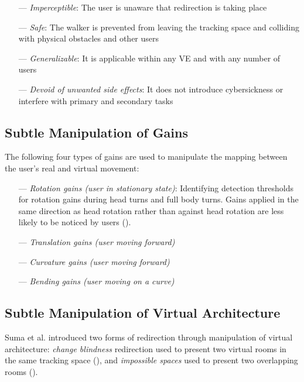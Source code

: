 \documentclass[12pt]{article}
\begin{document}
\begin{itemize}[noitemsep]
    \item[---] \emph{Imperceptible}: The user is unaware that redirection is taking place
    \item[---] \emph{Safe}: The walker is prevented from leaving the tracking space and colliding with physical obstacles and other users
    \item[---] \emph{Generalizable}: It is applicable within any VE and with any number of users
    \item[---] \emph{Devoid of unwanted side effects}: It does not introduce cybersickness or interfere with primary and secondary tasks
\end{itemize}

\subsection{Subtle Manipulation of Gains}

The following four types of gains are used to manipulate the mapping between the user's real and virtual movement:

\begin{itemize}[noitemsep]
    \item[---] \emph{Rotation gains (user in stationary state)}: Identifying detection thresholds for rotation gains during head turns and full body turns. Gains applied in the same direction as head rotation rather than against head rotation are less likely to be noticed by users (\cite{jerald2008sensitivity}).
    \item[---] \emph{Translation gains (user moving forward)}
    \item[---] \emph{Curvature gains (user moving forward)}
    \item[---] \emph{Bending gains (user moving on a curve)}
\end{itemize}

\subsection{Subtle Manipulation of Virtual Architecture}

Suma et al. introduced two forms of redirection through manipulation of virtual architecture: \emph{change blindness} redirection used to present two virtual rooms in the same tracking space (\cite{suma2011leveraging}), and \emph{impossible spaces} used to present two overlapping rooms (\cite{suma2012impossible}).
\end{document}
